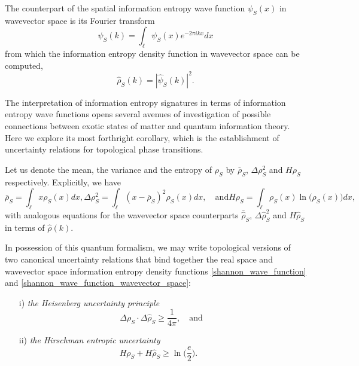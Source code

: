 \documentclass[10pt]{revtex4-1}
\begin{document}
The counterpart of the spatial information entropy wave function $\psi_S(x)$ in wavevector space is its Fourier transform 
\begin{equation}
\label{fourier_shannon_wave_function}
\hat{\psi}_S(k) = \int_{\ell}\psi_S(x)e^{-2\pi ikx}dx
\end{equation}
from which the information entropy density function in wavevector space can be computed,
\begin{equation}
\label{shannon_wave_function_wavevector_space}
\hat{\rho}_S(k) = |\hat{\psi}_S(k)|^2.
\end{equation}

The interpretation of information entropy signatures in terms of information entropy wave functions opens several avenues of investigation of possible connections between exotic states of matter and quantum information theory.  Here we explore its most forthright corollary, which is the establishment of uncertainty relations for topological phase transitions. 

Let us denote the mean, the variance and the entropy of $\rho_S$ by $\bar{\rho}_S$, $\Delta \rho_S^2 $ and $H{\rho_S}$ respectively. Explicitly, we have 
\begin{subequations}
\label{statistics}
\begin{equation}
\label{mean}
\bar{\rho}_S = \int_{\ell}x\rho_S(x)dx,
\end{equation}
\begin{equation}
\label{variance}
\Delta\rho_S^2 = \int_{\ell}(x-\bar{\rho}_S)^2\rho_S(x)dx,\quad \text{and}
\end{equation}
\begin{equation}
\label{entropy}
H{\rho_S} = \int_{\ell}\rho_S(x)\ln\big(\rho_S(x)\big) dx,
\end{equation}
\end{subequations}
with analogous equations for the wavevector space counterparts $\bar{\hat{\rho}}_S$, $\Delta \hat{\rho}_S^2 $ and $H{\hat{\rho}_S}$ in terms of $\hat{\rho}(k)$.

In possession of this quantum formalism, we may write topological versions of two canonical uncertainty relations that bind together the real space and wavevector space information entropy density functions \eqref{shannon_wave_function} and \eqref{shannon_wave_function_wavevector_space}: 

\begin{enumerate}
\item[i)] \emph{the Heisenberg uncertainty principle}
\begin{equation}
\label{heisenberg}
\Delta\rho_S \cdot \Delta\hat{\rho}_S \geq \frac{1}{4\pi}, \quad \text{and }
\end{equation}
\item[ii)] \emph{the Hirschman entropic uncertainty}
\begin{equation}
\label{hirschman}
H{\rho_S} + H{\hat{\rho}_S} \geq \ln\Big(\frac{e}{2}\Big). \quad
\end{equation}
\end{enumerate}
\end{document}
